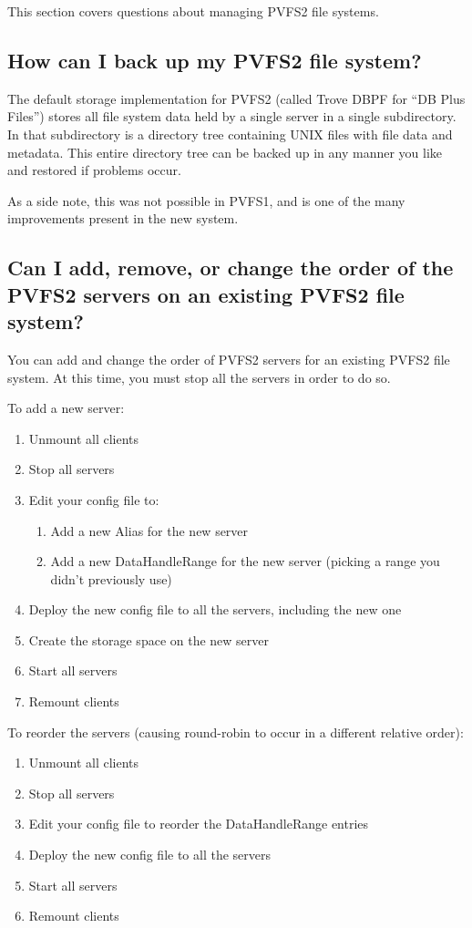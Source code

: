 \documentclass[11pt,letterpaper]{article}
\begin{document}
This section covers questions about managing PVFS2 file systems.

\subsection{How can I back up my PVFS2 file system?}

The default storage implementation for PVFS2 (called Trove DBPF for ``DB Plus
Files'') stores all file system data held by a single server in a single
subdirectory.  In that subdirectory is a directory tree containing UNIX files
with file data and metadata.
%
This entire directory tree can be backed up in any manner you like and
restored if problems occur.

As a side note, this was not possible in PVFS1, and is one of the many
improvements present in the new system.

\subsection{Can I add, remove, or change the order of the PVFS2 servers
            on an existing PVFS2 file system?}

You can add and change the order of PVFS2 servers for an existing PVFS2 file
system.  At this time, you must stop all the servers in order to do so.

To add a new server:
\begin{enumerate}
\item Unmount all clients
\item Stop all servers
\item Edit your config file to:
  \begin{enumerate}
  \item Add a new Alias for the new server
  \item Add a new DataHandleRange for the new server (picking a range you
        didn't previously use)
  \end{enumerate}
\item Deploy the new config file to all the servers, including the new one
\item Create the storage space on the new server
\item Start all servers
\item Remount clients
\end{enumerate}

To reorder the servers (causing round-robin to occur in a different relative
order):
\begin{enumerate}
\item Unmount all clients
\item Stop all servers
\item Edit your config file to reorder the DataHandleRange entries
\item Deploy the new config file to all the servers
\item Start all servers
\item Remount clients
\end{enumerate}
\end{document}

